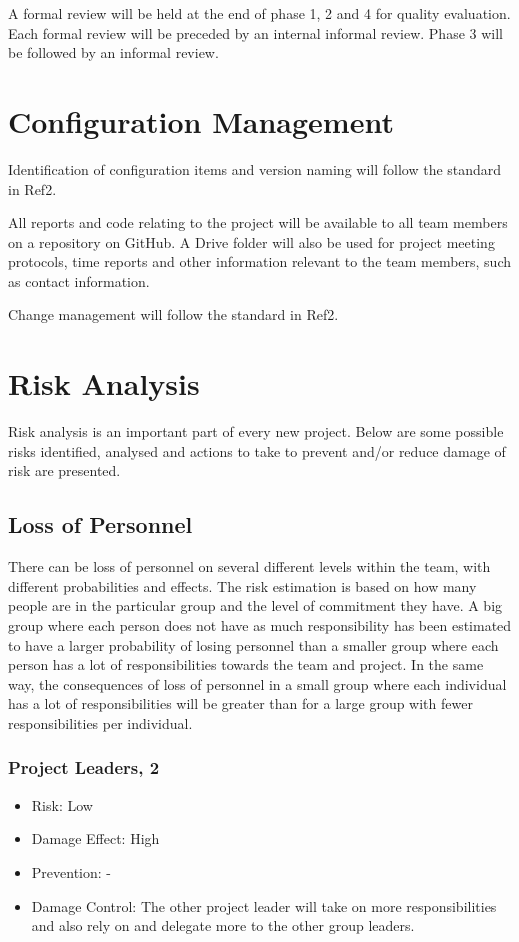 \documentclass[a4paper]{article}
\begin{document}
A formal review will be held at the end of phase 1, 2 and 4 for quality evaluation. Each formal review will be preceded by an internal informal review. Phase 3 will be followed by an informal review.

\section{Configuration Management}
Identification of configuration items and version naming will follow the standard in Ref2. 

All reports and code relating to the project will be available to all team members on a repository on GitHub. A Drive folder will also be used for project meeting protocols, time reports and other information relevant to the team members, such as contact information.

Change management will follow the standard in Ref2.

\section{Risk Analysis}

Risk analysis is an important part of every new project. Below are some possible risks identified, analysed and actions to take to prevent and/or reduce damage of risk are presented.  

\subsection{Loss of Personnel}
There can be loss of personnel on several different levels within the team, with different probabilities and effects. The risk estimation is based on how many people are in the particular group and the level of commitment they have. A big group where each person does not have as much responsibility has been estimated to have a larger probability of losing personnel than a smaller group where each person has a lot of responsibilities towards the team and project. In the same way, the consequences of loss of personnel in a small group where each individual has a lot of responsibilities will be greater than for a large group with fewer responsibilities per individual.


\subsubsection{Project Leaders, 2}
\begin{itemize}
\item Risk: Low
\item Damage Effect: High
\item Prevention: -
\item Damage Control: The other project leader will take on more responsibilities and also rely on and delegate more to the other group leaders.
\end{itemize}
\end{document}
